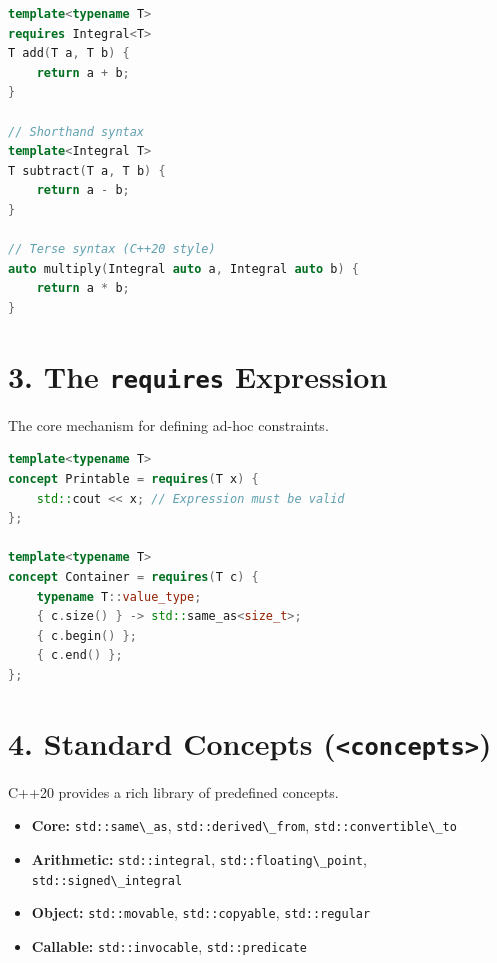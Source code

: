 \begin{lstlisting}[language={C++}]
template<typename T>
requires Integral<T>
T add(T a, T b) {
    return a + b;
}

// Shorthand syntax
template<Integral T>
T subtract(T a, T b) {
    return a - b;
}

// Terse syntax (C++20 style)
auto multiply(Integral auto a, Integral auto b) {
    return a * b;
}
\end{lstlisting}

\hypertarget{the-requires-expression}{%
\section{\texorpdfstring{3. The \texttt{requires}
Expression}{3. The requires Expression}}\label{the-requires-expression}}

The core mechanism for defining ad-hoc constraints.

\begin{lstlisting}[language={C++}]
template<typename T>
concept Printable = requires(T x) {
    std::cout << x; // Expression must be valid
};

template<typename T>
concept Container = requires(T c) {
    typename T::value_type;
    { c.size() } -> std::same_as<size_t>;
    { c.begin() }; 
    { c.end() };
};
\end{lstlisting}

\hypertarget{standard-concepts-concepts}{%
\section{\texorpdfstring{4. Standard Concepts
(\texttt{\textless{}concepts\textgreater{}})}{4. Standard Concepts (\textless concepts\textgreater)}}\label{standard-concepts-concepts}}

C++20 provides a rich library of predefined concepts.

\begin{itemize}
\tightlist
\item
  \textbf{Core:} \passthrough{\lstinline!std::same\_as!},
  \passthrough{\lstinline!std::derived\_from!},
  \passthrough{\lstinline!std::convertible\_to!}
\item
  \textbf{Arithmetic:} \passthrough{\lstinline!std::integral!},
  \passthrough{\lstinline!std::floating\_point!},
  \passthrough{\lstinline!std::signed\_integral!}
\item
  \textbf{Object:} \passthrough{\lstinline!std::movable!},
  \passthrough{\lstinline!std::copyable!},
  \passthrough{\lstinline!std::regular!}
\item
  \textbf{Callable:} \passthrough{\lstinline!std::invocable!},
  \passthrough{\lstinline!std::predicate!}
\end{itemize}

